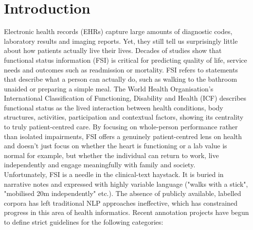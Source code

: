 
\chapter{Introduction}

Electronic health records (EHRs) capture large amounts of diagnostic codes, laboratory results and imaging reports. Yet, they still tell us surprisingly little about how patients actually live their lives. 
Decades of studies show that functional status information (FSI) is critical for predicting quality of life, service needs and outcomes such as readmission or mortality. FSI refers to statements that describe what a person can actually do, such as walking to the bathroom unaided or preparing a simple meal. The World Health Organisation's International Classification of Functioning, Disability and Health (ICF) describes functional status as the lived interaction between health conditions, body structures, activities, participation and contextual factors, showing its centrality to truly patient-centred care. By focusing on whole-person performance rather than isolated impairments, FSI offers a genuinely patient-centred lens on health and doesn't just focus on whether the heart is functioning or a lab value is normal for example, but whether the individual can return to work, live independently and engage meaningfully with family and society. \\

Unfortunately, FSI is a needle in the clinical-text haystack. It is buried in narrative notes and expressed with highly variable language ("walks with a stick", "mobilised 20m independently" etc.). The absence of publicly available, labelled corpora has left traditional NLP approaches ineffective, which has constrained progress in this area of health informatics. Recent annotation projects have begun to define strict guidelines for the following categories:

